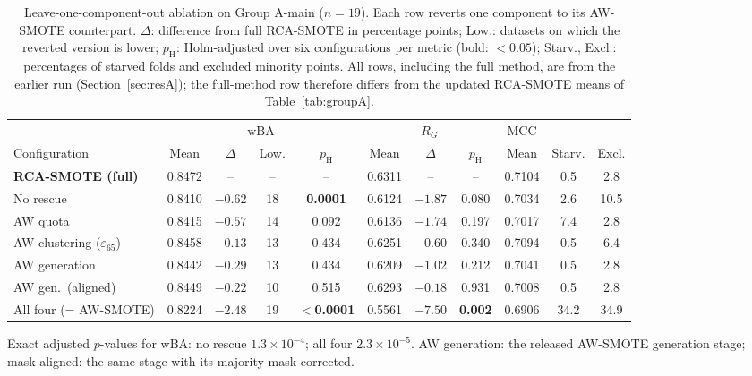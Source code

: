 \documentclass[preprint,nopreprintline]{elsarticle}
\theoremstyle{plain}
\theoremstyle{definition}
\newcommand{\wba}{\mathrm{wBA}}
\newcommand{\rg}{R_{G}}
\newcommand{\tabfont}{\fontsize{8}{9.4}\selectfont}
\providecommand{\botrule}{\bottomrule}
\begin{document}
\begin{table}[!htb]
\caption{Leave-one-component-out ablation on Group A-main ($n=19$). Each row reverts one component to its AW-SMOTE counterpart. $\Delta$: difference from full RCA-SMOTE in percentage points; Low.: datasets on which the reverted version is lower; $p_\mathrm{H}$: Holm-adjusted over six configurations per metric (bold: $<0.05$); Starv., Excl.: percentages of starved folds and excluded minority points. All rows, including the full method, are from the earlier run (Section~\ref{sec:resA}); the full-method row therefore differs from the updated RCA-SMOTE means of Table~\ref{tab:groupA}.}\label{tab:ablation}
\centering\tabfont
\setlength{\tabcolsep}{2.2pt}
\begin{adjustbox}{max width=\textwidth}
\begin{tabular}{@{}lcccccccccc@{}}
\toprule
 & \multicolumn{4}{c}{$\wba$} & \multicolumn{3}{c}{$\rg$} & MCC & & \\
\cmidrule(lr){2-5}\cmidrule(lr){6-8}
Configuration & Mean & $\Delta$ & Low. & $p_\mathrm{H}$ & Mean & $\Delta$ & $p_\mathrm{H}$ & Mean & Starv. & Excl. \\
\midrule
\textbf{RCA-SMOTE (full)} & 0.8472 & -- & -- & -- & 0.6311 & -- & -- & 0.7104 & 0.5 & 2.8 \\
No rescue & 0.8410 & $-0.62$ & 18 & \textbf{0.0001} & 0.6124 & $-1.87$ & 0.080 & 0.7034 & 2.6 & 10.5 \\
AW quota & 0.8415 & $-0.57$ & 14 & 0.092 & 0.6136 & $-1.74$ & 0.197 & 0.7017 & 7.4 & 2.8 \\
AW clustering ($\varepsilon_{65}$) & 0.8458 & $-0.13$ & 13 & 0.434 & 0.6251 & $-0.60$ & 0.340 & 0.7094 & 0.5 & 6.4 \\
AW generation & 0.8442 & $-0.29$ & 13 & 0.434 & 0.6209 & $-1.02$ & 0.212 & 0.7041 & 0.5 & 2.8 \\
AW gen.\ (aligned) & 0.8449 & $-0.22$ & 10 & 0.515 & 0.6293 & $-0.18$ & 0.931 & 0.7008 & 0.5 & 2.8 \\
All four (= AW-SMOTE) & 0.8224 & $-2.48$ & 19 & \textbf{$<$0.0001} & 0.5561 & $-7.50$ & \textbf{0.002} & 0.6906 & 34.2 & 34.9 \\
\botrule
\end{tabular}
\end{adjustbox}
\par\smallskip\raggedright\footnotesize Exact adjusted $p$-values for $\wba$: no rescue $1.3\times10^{-4}$; all four $2.3\times10^{-5}$. AW generation: the released AW-SMOTE generation stage; mask aligned: the same stage with its majority mask corrected.
\end{table}
\end{document}
